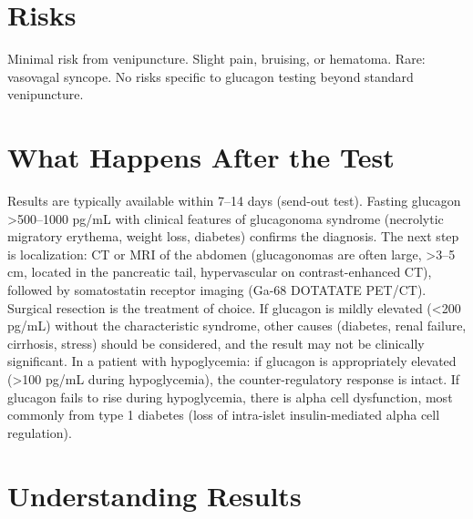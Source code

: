 \section*{Risks}
Minimal risk from venipuncture. Slight pain, bruising, or hematoma. Rare: vasovagal syncope. No risks specific to glucagon testing beyond standard venipuncture.

\section*{What Happens After the Test}
Results are typically available within 7--14 days (send-out test). Fasting glucagon >500--1000 pg/mL with clinical features of glucagonoma syndrome (necrolytic migratory erythema, weight loss, diabetes) confirms the diagnosis. The next step is localization: CT or MRI of the abdomen (glucagonomas are often large, >3--5 cm, located in the pancreatic tail, hypervascular on contrast-enhanced CT), followed by somatostatin receptor imaging (Ga-68 DOTATATE PET/CT). Surgical resection is the treatment of choice. If glucagon is mildly elevated (<200 pg/mL) without the characteristic syndrome, other causes (diabetes, renal failure, cirrhosis, stress) should be considered, and the result may not be clinically significant. In a patient with hypoglycemia: if glucagon is appropriately elevated (>100 pg/mL during hypoglycemia), the counter-regulatory response is intact. If glucagon fails to rise during hypoglycemia, there is alpha cell dysfunction, most commonly from type 1 diabetes (loss of intra-islet insulin-mediated alpha cell regulation).

\section*{Understanding Results}

